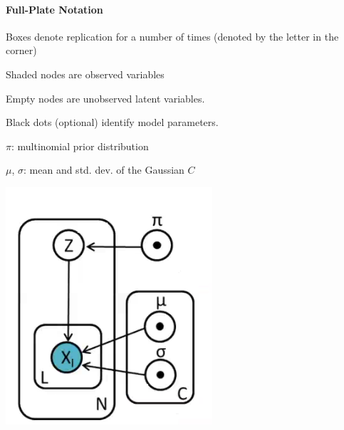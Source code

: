 \documentclass[10pt]{report}
\begin{document}
\paragraph{Full-Plate Notation}
\begin{multicols}{2}
\begin{list}{}{}
	\item Boxes denote replication for a number of times (denoted by the letter in the corner)
	\item Shaded nodes are observed variables
	\item Empty nodes are unobserved latent variables.
	\item Black dots (optional) identify model parameters.
	\begin{list}{}{}
		\item $\pi$: multinomial prior distribution
		\item $\mu$, $\sigma$: mean and std. dev. of the Gaussian $C$
	\end{list}
\end{list}
\columnbreak
\begin{center}
	\includegraphics[scale=0.6]{17.png}
\end{center}
\end{multicols}
\end{document}
